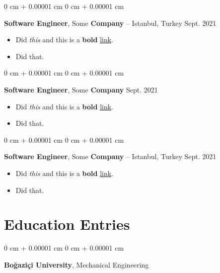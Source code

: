 \documentclass[10pt, letterpaper]{article}
\newenvironment{highlights}{
    \begin{itemize}[
        topsep=0.10 cm,
        parsep=0.10 cm,
        partopsep=0pt,
        itemsep=0pt,
        leftmargin=0 cm + 10pt
    ]
}{
    \end{itemize}
        
    \vspace{-0.20cm}
} %
\newenvironment{onecolentry}{
    \begin{adjustwidth}{
        0 cm + 0.00001 cm
    }{
        0 cm + 0.00001 cm
    }
}{
    \end{adjustwidth}
} %
\begin{document}
        \begin{onecolentry}
            \textbf{Software Engineer}, Some \textbf{Company} -- Istanbul, Turkey \hfill Sept. 2021
            \begin{highlights}
                \item Did \textit{this} and this is a \textbf{bold} \href{https://example.com}{link}.
                \item Did that.
            \end{highlights}
        \end{onecolentry}

        \vspace{0.1 cm}

        \begin{onecolentry}
            \textbf{Software Engineer}, Some \textbf{Company} \hfill Sept. 2021
            \begin{highlights}
                \item Did \textit{this} and this is a \textbf{bold} \href{https://example.com}{link}.
                \item Did that.
            \end{highlights}
        \end{onecolentry}

        \vspace{0.1 cm}

        \begin{onecolentry}
            \textbf{Software Engineer}, Some \textbf{Company} -- Istanbul, Turkey \hfill Sept. 2021
            \begin{highlights}
                \item Did \textit{this} and this is a \textbf{bold} \href{https://example.com}{link}.
                \item Did that.
            \end{highlights}
        \end{onecolentry}


    
    \section{Education Entries}

        
        \begin{onecolentry}
            \textbf{Boğaziçi University}, Mechanical Engineering \hfill 
        \end{onecolentry}
\end{document}
